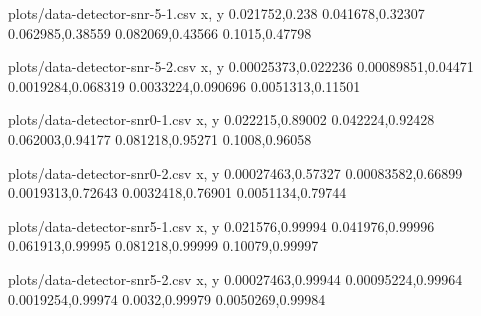 \documentclass[a4paper, openany, oneside]{memoir}
\begin{document}
\begin{filecontents*}{plots/data-detector-snr-5-1.csv}
x, y
0.021752,0.238
0.041678,0.32307
0.062985,0.38559
0.082069,0.43566
0.1015,0.47798
\end{filecontents*}
\begin{filecontents*}{plots/data-detector-snr-5-2.csv}
x, y
0.00025373,0.022236
0.00089851,0.04471
0.0019284,0.068319
0.0033224,0.090696
0.0051313,0.11501
\end{filecontents*}
\begin{filecontents*}{plots/data-detector-snr0-1.csv}
x, y
0.022215,0.89002
0.042224,0.92428
0.062003,0.94177
0.081218,0.95271
0.1008,0.96058
\end{filecontents*}
\begin{filecontents*}{plots/data-detector-snr0-2.csv}
x, y
0.00027463,0.57327
0.00083582,0.66899
0.0019313,0.72643
0.0032418,0.76901
0.0051134,0.79744
\end{filecontents*}
\begin{filecontents*}{plots/data-detector-snr5-1.csv}
x, y
0.021576,0.99994
0.041976,0.99996
0.061913,0.99995
0.081218,0.99999
0.10079,0.99997
\end{filecontents*}
\begin{filecontents*}{plots/data-detector-snr5-2.csv}
x, y
0.00027463,0.99944
0.00095224,0.99964
0.0019254,0.99974
0.0032,0.99979
0.0050269,0.99984
\end{filecontents*}
\end{document}
